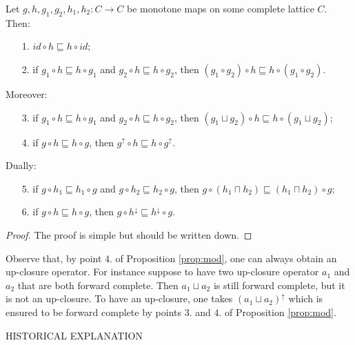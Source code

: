 \documentclass{llncs}
\begin{document}
\begin{proposition}[modularity]\label{prop:mod}
Let $g,h,g_1,g_2,h_1,h_2\colon C\to C$ be monotone maps on some complete lattice $C$. 
Then:
\begin{enumerate}
\item[1.] $id \circ h \sqsubseteq h \circ id$;
\item[2.] if  $g_1 \circ h \sqsubseteq h \circ g_1$ and $g_2 \circ h \sqsubseteq h \circ g_2$, then $(g_1 \circ g_2) \circ h \sqsubseteq h \circ (g_1 \circ g_2)$.
\end{enumerate}
Moreover:
\begin{enumerate}
\item[3.] if  $g_1 \circ h \sqsubseteq h \circ g_1$ and $g_2 \circ h \sqsubseteq h \circ g_2$, then $(g_1 \sqcup g_2) \circ h \sqsubseteq h \circ (g_1 \sqcup g_2)$;
\item[4.] if  $g \circ h \sqsubseteq h \circ g$, then $g^\uparrow \circ h \sqsubseteq h \circ g^\uparrow$.
\end{enumerate}
Dually:
\begin{enumerate}
\item[5.] if  $g \circ h_1 \sqsubseteq h_1 \circ g$ and $g \circ h_2 \sqsubseteq h_2 \circ g$, then $g\circ  (h_1 \sqcap  h_2) \sqsubseteq (h_1 \sqcap h_2) \circ g$;
\item[6.] if  $g \circ h \sqsubseteq h \circ g$, then $g \circ h^\downarrow \sqsubseteq h^\downarrow \circ g$.
\end{enumerate}
\end{proposition}
\begin{proof}
The proof is simple but should be written down.
\end{proof}

\begin{remark}
Observe that, by point $4.$ of Proposition \ref{prop:mod}, one can always obtain an up-closure operator. For instance suppose to have two up-closure operator $a_1$ and $a_2$ that are both forward complete.  Then $a_1 \sqcup a_2$ is still forward complete, but it is not an up-closure. To have an up-closure, one takes $(a_1\sqcup a_2)^\uparrow$ which is ensured to be forward complete by points $3.$ and $4.$ of Proposition \ref{prop:mod}.
\end{remark}

\begin{remark}
HISTORICAL EXPLANATION
\end{remark}
\end{document}
